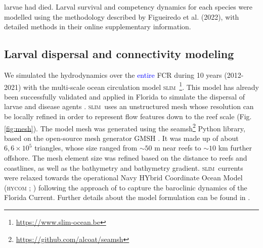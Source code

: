 \documentclass[preprint,12pt,authoryear]{elsarticle}
\newcommand{\modif}[1]{\textcolor{blue}{#1}}
\newcommand{\hycom}{\textsc{hycom} }
\newcommand{\slim}{\textsc{slim}\ }
\begin{document}
larvae had died. Larval survival and competency dynamics for each species were modelled using the methodology described by Figueiredo et al. (2022), with detailed methods in their online supplementary information.
	
	\subsection*{Larval dispersal and connectivity modeling}
	
	We simulated the hydrodynamics over the \modif{entire} FCR during 10 years (2012-2021) with the multi-scale ocean circulation model \slim\footnote{\href{ https://www.slim-ocean.be}{https://www.slim-ocean.be}}. This model has already been successfully validated and applied in Florida to simulate the dispersal of larvae and disease agents \citep{frys2020fine,dobbelaere2020coupled,dobbelaere2022connecting,king2023larval}. \slim uses an unstructured mesh whose resolution can be locally refined in order to represent flow features down to the reef scale (Fig. \ref{fig:mesh}). The model mesh was generated using the seamsh\footnote{\href{https://github.com/alcoat/seamsh}{https://github.com/alcoat/seamsh}} Python library, based on the open-source mesh generator GMSH \citep{geuzaine2009gmsh}. It was made up of about $6,6\times 10^5$ triangles, whose size ranged from $\sim 50$ m near reefs to $\sim 10$ km further offshore. The mesh element size was refined based on the distance to reefs and coastlines, as well as the bathymetry and bathymetry gradient. \slim currents were relaxed towards the operational Navy HYbrid Coordinate Ocean Model (\hycom; \citealp{chassignet2007hycom}) following the approach of \citep{dobbelaere2022impacts} to capture the baroclinic dynamics of the Florida Current. Further details about the model formulation can be found in \citep{frys2020fine}.
	
\end{document}
